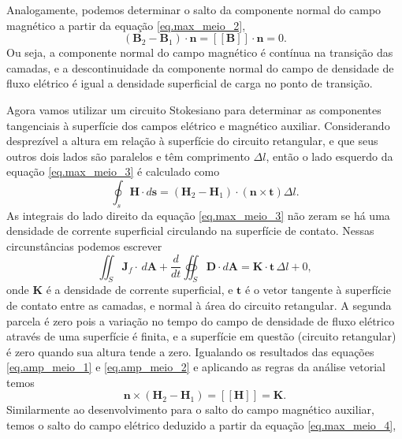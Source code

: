 Analogamente, podemos determinar o salto da componente normal do campo magn\'etico a partir da equa\c{c}\~ao \ref{eq.max_meio_2},
\begin{equation*}
(\mathbf{B}_2-\mathbf{B}_1)\cdot\mathbf{n}=\left[\left[\mathbf{B}\right]\right]\cdot\mathbf{n}=0.
\end{equation*}  
Ou seja, a componente normal do campo magn\'etico \'e cont\'inua na transi\c{c}\~ao das camadas, e a descontinuidade da componente normal do campo de densidade de fluxo el\'etrico \'e igual a densidade superficial de carga no ponto de transi\c{c}\~ao.

Agora vamos utilizar um circuito Stokesiano para determinar as componentes tangenciais \`a superf\'icie dos campos el\'etrico e magn\'etico auxiliar. Considerando desprez\'ivel a altura em rela\c{c}\~ao \`a superf\'icie do circuito retangular, e que seus outros dois lados s\~ao paralelos e t\^em comprimento $\Delta l$, ent\~ao o lado esquerdo da equa\c{c}\~ao \ref{eq.max_meio_3} \'e calculado como
\begin{equation}\label{eq.amp_meio_1}
\oint_s\mathbf{H}\cdot d\mathbf{s}=(\mathbf{H}_2-\mathbf{H}_1)\cdot(\mathbf{n}\times\mathbf{t})\Delta l.
\end{equation}
As integrais do lado direito da equa\c{c}\~ao \ref{eq.max_meio_3} n\~ao zeram se h\'a uma densidade de corrente superficial circulando na superf\'icie de contato. Nessas circunst\^ancias podemos escrever
\begin{equation}\label{eq.amp_meio_2}
\iint_S\mathbf{J}_f\cdot\,d\mathbf{A}+\frac{d}{dt}\oiint_S\mathbf{D}\cdot\textit{d}\textbf{A}=\mathbf{K}\cdot\mathbf{t}\,\Delta l+0,
\end{equation}
onde $\mathbf{K}$ \'e a densidade de corrente superficial, e $\mathbf{t}$ \'e o vetor tangente \`a superf\'icie de contato entre as camadas, e normal \`a \'area do circuito retangular. A segunda parcela \'e zero pois a varia\c{c}\~ao no tempo do campo de densidade de fluxo el\'etrico atrav\'es de uma superf\'icie \'e finita, e a superf\'icie em quest\~ao (circuito retangular) \'e zero quando sua altura tende a zero. Igualando os resultados das equa\c{c}\~oes \ref{eq.amp_meio_1} e \ref{eq.amp_meio_2} e aplicando as regras da an\'alise vetorial temos
\begin{equation}\label{eq.far_meio_1}
\mathbf{n}\times(\mathbf{H}_2-\mathbf{H}_1)=\left[\left[\mathbf{H}\right]\right]=\mathbf{K}.
\end{equation}
Similarmente ao desenvolvimento para o salto do campo magn\'etico auxiliar, temos o salto do campo el\'etrico deduzido a partir da equa\c{c}\~ao \ref{eq.max_meio_4},
